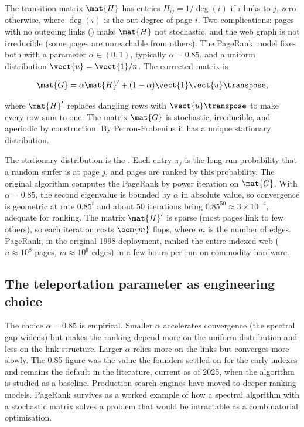 The transition matrix $\mat{H}$ has entries $H_{ij} = 1/\deg(i)$ if
$i$ links to $j$, zero otherwise, where $\deg(i)$ is the
out-degree of page $i$. Two complications: pages with no outgoing
links () make $\mat{H}$ not stochastic, and
the web graph is not irreducible (some pages are unreachable from
others). The PageRank model fixes both with a 
parameter $\alpha \in (0, 1)$, typically $\alpha = 0.85$, and a
uniform distribution $\vect{u} = \vect{1}/n$. The corrected matrix
is

\[
\mat{G} = \alpha \mat{H}' + (1 - \alpha) \vect{1} \vect{u}\transpose,
\]

where $\mat{H}'$ replaces dangling rows with $\vect{u}\transpose$ to
make every row sum to one. The matrix $\mat{G}$ is stochastic,
irreducible, and aperiodic by construction. By Perron-Frobenius it
has a unique stationary distribution.

The stationary distribution is the . Each
entry $\pi_{j}$ is the long-run probability that a random surfer is
at page $j$, and pages are ranked by this probability. The original
algorithm computes the PageRank by power iteration on $\mat{G}$.
With $\alpha = 0.85$, the second eigenvalue is bounded by $\alpha$
in absolute value, so convergence is geometric at rate $0.85^{t}$
and about $50$ iterations bring $0.85^{50} \approx 3 \times 10^{-4}$,
adequate for ranking. The matrix $\mat{H}'$ is sparse (most pages
link to few others), so each iteration costs $\oom{m}$ flops, where
$m$ is the number of edges. PageRank, in the original 1998 deployment,
ranked the entire indexed web ($n \approx 10^{8}$ pages, $m
\approx 10^{9}$ edges) in a few hours per run on commodity hardware.

\subsection{The teleportation parameter as engineering choice}

The choice $\alpha = 0.85$ is empirical. Smaller $\alpha$ accelerates
convergence (the spectral gap widens) but makes the ranking depend
more on the uniform distribution and less on the link structure.
Larger $\alpha$ relies more on the links but converges more slowly.
The 0.85 figure was the value the founders settled on for the early
indexes and remains the default in the literature, current as of
2025, when the algorithm is studied as a baseline. Production search
engines have moved to deeper ranking models. PageRank survives as a
worked example of how a spectral algorithm with a stochastic matrix
solves a problem that would be intractable as a combinatorial
optimisation.

